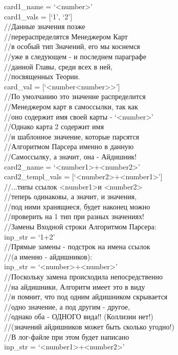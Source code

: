 \documentclass{book}
\newcommand{\less}{\textless}
\newcommand{\more}{\textgreater}
\begin{document}
\begin{tcolorbox}[breakable]
card1\_name = `\less number\more' \\
card1\_vals = [`1', `2'] \\
//Данные значения позже \\
//перераспределятся Менеджером Карт \\
//в особый тип Значений, его мы коснемся \\
//уже в следующем - и последнем параграфе \\
//данной Главы, среди всех в ней, \\
//посвященных Теории. \\
card\_val = [`\less number\less number\more\more'] \\
//По умолчанию это значение распределится \\
//Менеджером карт в самоссылки, так как \\
//оно содержит имя своей карты - `\less number\more' \\
//Однако карта 2 содержит имя \\
//и шаблонное значение, которые парсятся \\
//Алгоритмом Парсера именно в данную \\
//Самоссылку, а значит, она - Айдишник! \\

card2\_name = `\less number1\more+\less number2\more' \\
card2\_templ\_vals = [`\less number2\more+\less number1\more'] \\
//...типы ссылок \less number1\more и \less number2\more \\
//теперь одинаковы, а значит, и значения, \\
//под ними хранящиеся, будет наконец можно \\
//проверить на 1 тип при разных значениях! \\

//Замены Входной строки Алгоритмом Парсера: \\
inp\_str = `1+2' \\

//Прямые замены - подстрок на имена ссылок \\
//(а именно - айдишников): \\
inp\_str = `\less number\more+\less number\more' \\
//Поскольку замена происходила непосредственно \\
//на айдишники, Алгоритм имеет это в виду \\
//и помнит, что под одним айдишником скрывается \\
//одно значение, а под другим - другое, \\
//однако оба - ОДНОГО вида!! (Коллизии нет!) \\
//(значений айдишников может быть сколько угодно!) \\
//В лог-файле при этом будет написано \\
inp\_str = `\less number1\more+\less number2\more' \\


\end{tcolorbox}
\end{document}

